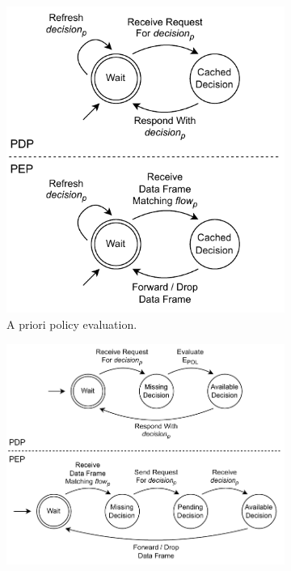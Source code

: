 \begin{figure}
    \centering
    \begin{subfigure}[t]{0.40\linewidth}
        \centering
        \includegraphics[width=\linewidth]{figures/apriori_evaluation_strategy.drawio.pdf}
        \caption{A priori policy evaluation.}
        \label{fig:apriori_policy_evaluation_strategy}
    \end{subfigure}
    \hfill
    \begin{subfigure}[t]{0.55\linewidth}
        \centering
        \includegraphics[width=\linewidth]{figures/aposteriori_evaluation_strategy.drawio.pdf}

\end{subfigure}
\end{figure}
